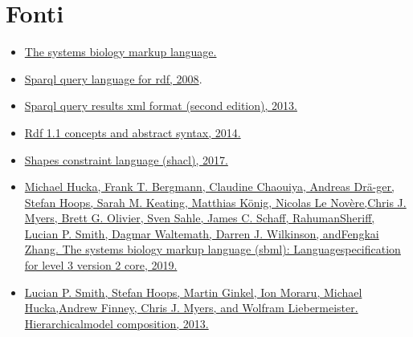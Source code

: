 \documentclass{article}
\begin{document}
\clearpage
\section{Fonti}
\begin{itemize}
    \item \href{http://sbml.org/Main_Page}{The systems biology markup language.}
    \item \href{https://www.w3.org/TR/rdf-sparql-query/}{Sparql query language for rdf, 2008}.  
    \item \href{https://www.w3.org/TR/rdf-sparql-XMLres/#defn-srd}{Sparql query results xml format (second edition), 2013.}
    \item \href{https://www.w3.org/TR/rdf11-concepts/#dfn-datatype}{Rdf 1.1 concepts and abstract syntax, 2014.}
    \item \href{https://www.w3.org/TR/shacl/}{Shapes constraint language (shacl), 2017.}
    \item \href{http://co.mbine.org/specifications/sbml.level-3.version-2.core.release-2.pdf}{Michael Hucka, Frank T. Bergmann, Claudine Chaouiya, Andreas Drä-ger, Stefan Hoops, Sarah M. Keating, Matthias König, Nicolas Le Novère,Chris J. Myers, Brett G. Olivier, Sven Sahle, James C. Schaff, RahumanSheriff, Lucian P. Smith, Dagmar Waltemath, Darren J. Wilkinson, andFengkai Zhang. The systems biology markup language (sbml): Languagespecification for level 3 version 2 core, 2019.} 
    \item \href{https://authors.library.caltech.edu/50975/1/sbml-comp-version-1-release-3.pdf}{Lucian P. Smith, Stefan Hoops, Martin Ginkel, Ion Moraru, Michael Hucka,Andrew Finney, Chris J. Myers, and Wolfram Liebermeister. Hierarchicalmodel composition, 2013.} 
\end{itemize}
\end{document}
